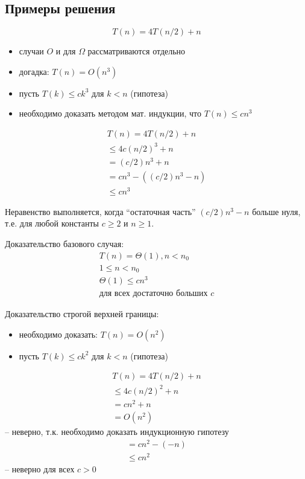 \documentclass[a4paper,11pt]{article}
\begin{document}
\subsection{Примеры решения}
\begin{equation*}
  T(n) = 4T(n/2) + n
\end{equation*}
\begin{itemize}
\item случаи $O$ и для $\Omega$ рассматриваются отдельно
\item догадка: $T(n) = O(n^3)$
\item пусть $T(k) \leqslant c k^3$ для $k < n$ (гипотеза)
\item необходимо доказать методом мат. индукции, что $T(n) \leqslant c n^3$
\end{itemize}
\begin{align*}
  T(n) = 4T(n/2) + n \\
  \leqslant 4c(n/2)^3 + n \\
  = (c/2)n^3 + n \\
  = c n^3 - ((c/2)n^3 -n) \\
  \leqslant c n^3
\end{align*}

Неравенство выполняется, когда ``остаточная часть'' $(c/2)n^3 -n$ больше нуля,
т.е. для любой константы $c \geqslant 2$ и $n \geqslant 1$.

Доказательство базового случая:
\begin{align*}
  T(n) = \Theta(1), n < n_0 \\
    1 \leqslant n < n_0 \\
    \Theta(1) \leqslant c n^3 \\
    \text{для всех достаточно больших } c
\end{align*}

Доказательство строгой верхней границы:
\begin{itemize}
\item необходимо доказать: $T(n) = O(n^2)$
\item пусть $T(k) \leqslant c k^2$ для $k < n$ (гипотеза)
\end{itemize}
\begin{align*}
  T(n) = 4T(n/2) + n \\
    \leqslant 4c(n/2)^2 + n \\
    = c n^2 + n \\
    = O(n^2)
\end{align*}
-- неверно, т.к. необходимо доказать индукционную гипотезу
\begin{align*}
    = c n^2 - (-n)\\
    \leqslant c n^2
\end{align*}
-- неверно для всех $c > 0$
\end{document}
